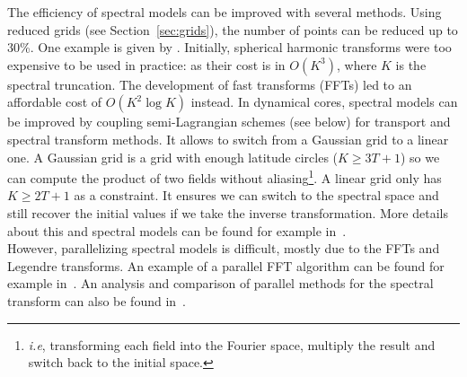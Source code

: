 The efficiency of spectral models can be improved with several methods. Using
reduced grids (see Section~\ref{sec:grids}), the number of points can be reduced
up to 30\%. One example is given by \cite{Hortal1990}.  Initially, spherical
harmonic transforms were too expensive to be used in practice: as their cost is
in $O(K^3)$, where $K$ is the spectral truncation. The development of fast
transforms (FFTs) led to an affordable cost of $O(K^2\log K)$ instead.  In
dynamical cores, spectral models can be improved by coupling semi-Lagrangian
schemes (see below) for transport and spectral transform methods. It allows to
switch from a Gaussian grid to a linear one. A Gaussian grid is a grid with
enough latitude circles ($K\ge3T+1$) so we can compute the product of two fields
without aliasing\footnote{\textit{i.e}, transforming each field into the Fourier
space, multiply the result and switch back to the initial space.}. A linear grid
only has $K \ge 2T+1$ as a constraint.  It ensures we can switch to the spectral
space and still recover the initial values if we take the inverse
transformation. More details about this and spectral models can be found for
example in~\cite{Hack1992}.\\
However, parallelizing spectral models is difficult, mostly due to the
\glspl{FFT} and Legendre transforms. An example of a parallel FFT algorithm can
be found for example in~\cite{Swarztrauber1987}. An analysis and comparison of
parallel methods for the spectral transform can also be found
in~\cite{Foster2008}.

